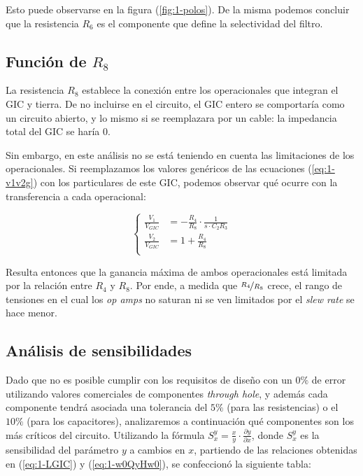 \documentclass[../../tc_tp3_main.tex]{subfiles}
\begin{document}
Esto puede observarse en la figura (\ref{fig:1-polos}). De la misma podemos concluir que la resistencia $R_6$ es el componente que define la selectividad del filtro.



\subsection{Funci\'on de $R_8$}

La resistencia $R_8$ establece la conexi\'on entre los operacionales que integran el GIC y tierra. De no incluirse en el circuito, el GIC entero se comportar\'ia como un circuito abierto, y lo mismo si se reemplazara por un cable: la impedancia total del GIC se har\'ia 0. \par

Sin embargo, en este an\'alisis no se est\'a teniendo en cuenta las limitaciones de los operacionales. Si reemplazamos los valores gen\'ericos de las ecuaciones (\ref{eq:1-v1v2g}) con los particulares de este GIC, podemos observar qu\'e ocurre con la transferencia a cada operacional:

\begin{equation}
	\left\{
	 	\begin{aligned}
			\frac{V_1}{V_{GIC}} &= -\frac{R_4}{R_8} \cdot \frac{1}{s\cdot C_2 R_3}\\
			\frac{V_2}{V_{GIC}} &= 1+ \frac{R_4}{R_8} \\ 
		\end{aligned}
	\right.
	\label{eq:v1v2vgic}
 \end{equation}

Resulta entonces que la ganancia m\'axima de ambos operacionales est\'a limitada por la relaci\'on entre $R_4$ y $R_8$. Por ende, a medida que $\nicefrac{R_4}{R_8}$ crece, el rango de tensiones en el cual los \textit{op amps} no saturan ni se ven limitados por el \textit{slew rate} se hace menor. \par



\subsection{An\'alisis de sensibilidades}

Dado que no es posible cumplir con los requisitos de dise\~no con un $0\%$ de error utilizando valores comerciales de componentes \textit{through hole}, y adem\'as cada componente tendr\'a asociada una tolerancia del $5\%$ (para las resistencias) o el $10\%$ (para los capacitores), analizaremos a continuaci\'on qu\'e componentes son los m\'as cr\'iticos del circuito. Utilizando la f\'ormula $S_{x}^{y} = \frac{x}{y} \cdot  \frac{\partial y}{\partial x}$, donde $S_x^y$ es la sensibilidad del par\'ametro $y$ a cambios en $x$, partiendo de las relaciones obtenidas en (\ref{eq:1-LGIC}) y (\ref{eq:1-w0QyHw0}), se confeccion\'o la siguiente tabla:
\end{document}
